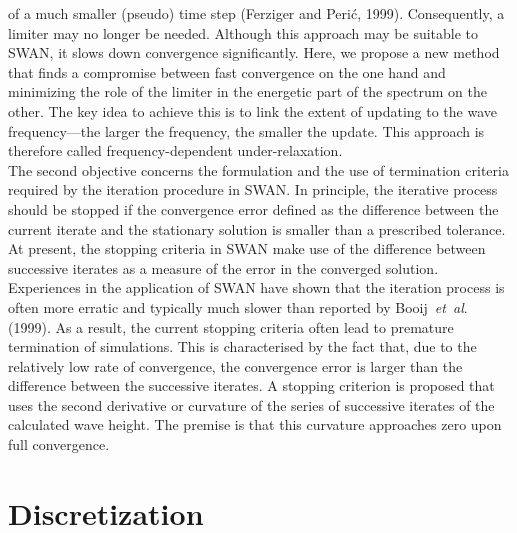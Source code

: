 \documentclass[12pt]{book}
\begin{document}
of a much smaller (pseudo) time step (Ferziger and Peri\'{c}, 1999).
Consequently, a limiter may no longer be needed. Although this
approach may be suitable to SWAN, it slows down convergence significantly.
Here, we propose a new method that finds a
compromise between fast convergence on the one hand and minimizing the role of the limiter in the
energetic part of the
spectrum on the other. The key idea to achieve this is to link the extent of updating to the wave
frequency---the
larger the frequency, the smaller the update. This approach is therefore called frequency-dependent
under-relaxation.
\nocite{Fer99P}
\\[2ex]
\noindent
The second objective concerns the formulation and the use of termination criteria required by
the iteration procedure in SWAN.
In principle, the iterative process should be stopped if the convergence error defined as the
difference between the current iterate and the stationary solution is smaller
than a prescribed tolerance. At present, the stopping criteria in SWAN make
use of the difference between successive iterates as a measure of the error
in the converged solution.
Experiences in the application of SWAN have shown that the iteration process is often
more erratic and typically much slower than reported by Booij~{\it et~al}. (1999).
As a result, the current stopping criteria
often lead to premature termination of simulations. This is characterised by the fact that,
due to the relatively low rate of convergence,
the convergence error is larger than the difference between the successive iterates.
A stopping criterion is proposed that uses the second derivative
or curvature of the series of successive iterates of the calculated wave height. The premise is that
this curvature approaches zero upon full convergence.
\nocite{Boo99RH}

\section{Discretization} \label{sec:dsc}
\end{document}
